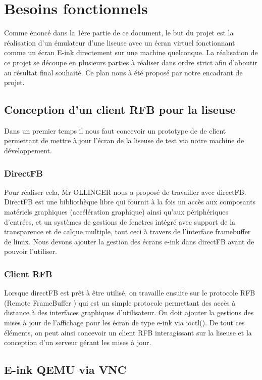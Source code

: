 \chapter{Besoins fonctionnels}

Comme énoncé dans la 1ère partie de ce document, le but du projet est la réalisation d'un émulateur d'une liseuse avec un écran virtuel fonctionnant comme un écran E-ink directement sur une machine quelconque. La réalisation de ce projet se découpe en plusieurs parties à réaliser dans ordre strict afin d'aboutir au résultat final souhaité. Ce plan nous à été proposé par notre encadrant de projet. 

\section{Conception d'un client RFB pour la liseuse}

Dans un premier temps il nous faut concevoir un prototype de de client permettant de mettre à jour l'écran de la liseuse de test via notre machine de développement.

\subsection{DirectFB}
 Pour réaliser cela, Mr OLLINGER nous a proposé de travailler avec directFB. DirectFB est une bibliothèque libre qui fournit à la fois un accès aux composants matériels graphiques (accélération graphique) ainsi qu'aux périphériques d'entrées, et un systèmes de gestions de fenetres intégré avec support de la transparence et de calque multiple, tout ceci à travers de l'interface framebuffer de linux. Nous devons ajouter la gestion des écrans e-ink dans directFB avant de pouvoir l'utiliser. 
 
\subsection{Client RFB}
Lorsque directFB est prêt à être utilisé, on travaille ensuite sur le protocole RFB (Remote FrameBuffer ) qui est un simple protocole permettant des accès à distance à des interfaces graphiques d'utilisateur. On doit ajouter la gestions des mises à jour de l'affichage pour les écran de type e-ink via ioctl(). De tout ces éléments, on peut ainsi concevoir un client RFB interagissant sur la liseuse et la conception d'un serveur gérant les mises à jour. 

\section{E-ink QEMU via VNC}

